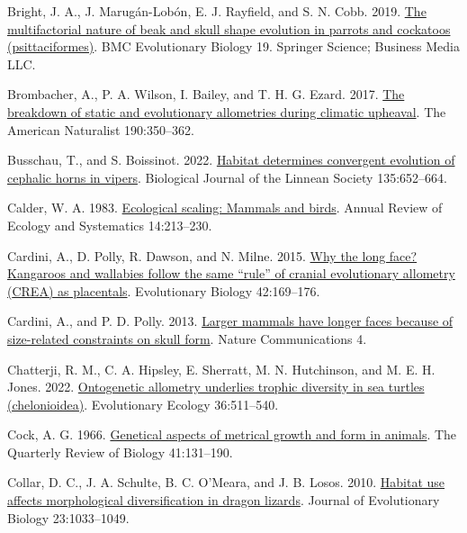 \documentclass[
  11pt,
]{article}
\newlength{\cslhangindent}
\newlength{\cslentryspacingunit} %
\newenvironment{CSLReferences}[2] %
 {%
  \setlength{\parindent}{0pt}
  \ifodd #1
  \let\oldpar\par
  \def\par{\hangindent=\cslhangindent\oldpar}
  \fi
  \setlength{\parskip}{#2\cslentryspacingunit}
 }%
 {}
\begin{document}
\begin{CSLReferences}{1}{0}
\leavevmode{}%
Bright, J. A., J. Marugán-Lobón, E. J. Rayfield, and S. N. Cobb. 2019.
\href{https://doi.org/10.1186/s12862-019-1432-1}{The multifactorial
nature of beak and skull shape evolution in parrots and cockatoos
(psittaciformes)}. {BMC} Evolutionary Biology 19. Springer Science;
Business Media {LLC}.

\leavevmode{}%
Brombacher, A., P. A. Wilson, I. Bailey, and T. H. G. Ezard. 2017.
\href{https://doi.org/10.1086/692570}{The breakdown of static and
evolutionary allometries during climatic upheaval}. The American
Naturalist 190:350--362.

\leavevmode{}%
Busschau, T., and S. Boissinot. 2022.
\href{https://doi.org/10.1093/biolinnean/blac008}{{Habitat determines
convergent evolution of cephalic horns in vipers}}. Biological Journal
of the Linnean Society 135:652--664.

\leavevmode{}%
Calder, W. A. 1983.
\href{https://doi.org/10.1146/annurev.es.14.110183.001241}{Ecological
scaling: Mammals and birds}. Annual Review of Ecology and Systematics
14:213--230.

\leavevmode{}%
Cardini, A., D. Polly, R. Dawson, and N. Milne. 2015.
\href{https://doi.org/10.1007/s11692-015-9308-9}{Why the long face?
Kangaroos and wallabies follow the same {``rule''} of cranial
evolutionary allometry ({CREA}) as placentals}. Evolutionary Biology
42:169--176.

\leavevmode{}%
Cardini, A., and P. D. Polly. 2013.
\href{https://doi.org/10.1038/ncomms3458}{Larger mammals have longer
faces because of size-related constraints on skull form}. Nature
Communications 4.

\leavevmode{}%
Chatterji, R. M., C. A. Hipsley, E. Sherratt, M. N. Hutchinson, and M.
E. H. Jones. 2022.
\href{https://doi.org/10.1007/s10682-022-10162-z}{Ontogenetic allometry
underlies trophic diversity in sea turtles (chelonioidea)}. Evolutionary
Ecology 36:511--540.

\leavevmode{}%
Cock, A. G. 1966. \href{https://doi.org/10.1086/404940}{Genetical
aspects of metrical growth and form in animals}. The Quarterly Review of
Biology 41:131--190.

\leavevmode{}%
Collar, D. C., J. A. Schulte, B. C. O'Meara, and J. B. Losos. 2010.
\href{https://doi.org/10.1111/j.1420-9101.2010.01971.x}{Habitat use
affects morphological diversification in dragon lizards}. Journal of
Evolutionary Biology 23:1033--1049.


\end{CSLReferences}
\end{document}
